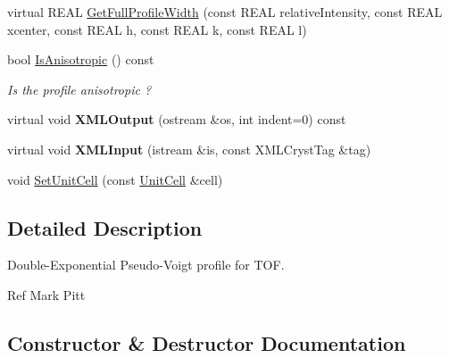 \begin{DoxyCompactItemize}
\item 
virtual R\+E\+AL \mbox{\hyperlink{class_obj_cryst_1_1_reflection_profile_double_exponential_pseudo_voigt_a92a2e4fd2b10e0edc07b338b79b59418}{Get\+Full\+Profile\+Width}} (const R\+E\+AL relative\+Intensity, const R\+E\+AL xcenter, const R\+E\+AL h, const R\+E\+AL k, const R\+E\+AL l)
\item 
\mbox{\label{class_obj_cryst_1_1_reflection_profile_double_exponential_pseudo_voigt_a1e2ccf6f8865947aaeed45cbb398ee2e}} 
bool \mbox{\hyperlink{class_obj_cryst_1_1_reflection_profile_double_exponential_pseudo_voigt_a1e2ccf6f8865947aaeed45cbb398ee2e}{Is\+Anisotropic}} () const
\begin{DoxyCompactList}\small\item\em Is the profile anisotropic ? \end{DoxyCompactList}\item 
\mbox{\label{class_obj_cryst_1_1_reflection_profile_double_exponential_pseudo_voigt_a2872d4a2c0ecf3a4dc1bc330f690fce7}} 
virtual void {\bfseries X\+M\+L\+Output} (ostream \&os, int indent=0) const
\item 
\mbox{\label{class_obj_cryst_1_1_reflection_profile_double_exponential_pseudo_voigt_a47940ef614d1813f377566fc50dcdc41}} 
virtual void {\bfseries X\+M\+L\+Input} (istream \&is, const X\+M\+L\+Cryst\+Tag \&tag)
\item 
void \mbox{\hyperlink{class_obj_cryst_1_1_reflection_profile_double_exponential_pseudo_voigt_a917d6e23b96ac2a9ffc4b9e45002d505}{Set\+Unit\+Cell}} (const \mbox{\hyperlink{class_obj_cryst_1_1_unit_cell}{Unit\+Cell}} \&cell)
\end{DoxyCompactItemize}


\subsection{Detailed Description}
Double-\/\+Exponential Pseudo-\/\+Voigt profile for T\+OF.

Ref Mark Pitt 

\subsection{Constructor \& Destructor Documentation}
\mbox{\label{class_obj_cryst_1_1_reflection_profile_double_exponential_pseudo_voigt_a99d69f5a755094081165c27f8cbc0de2}} 
